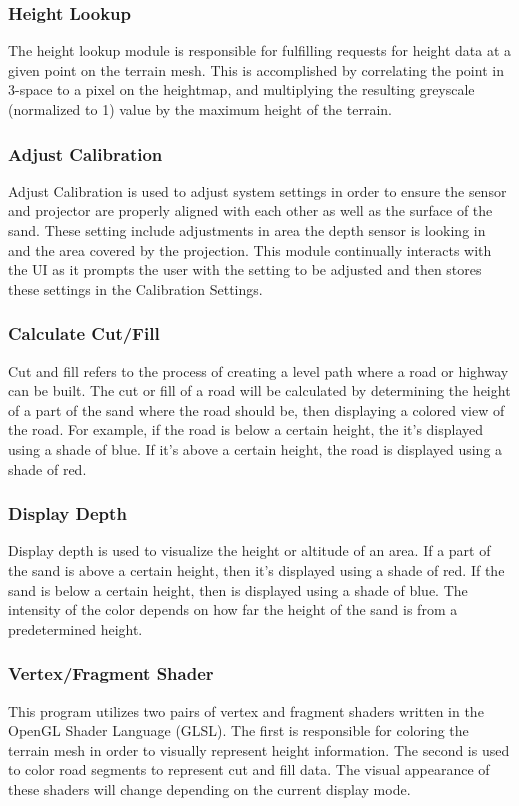 \documentclass[onecolumn, draftclsnofoot,10pt, compsoc]{IEEEtran}
\begin{document}
\subsubsection{Height Lookup}
The height lookup module is responsible for fulfilling requests for height data at a given point on the terrain mesh.
This is accomplished by correlating the point in 3-space to a pixel on the heightmap, and multiplying the resulting greyscale (normalized to 1) value by the maximum height of the terrain.

\subsubsection{Adjust Calibration} %
Adjust Calibration is used to adjust system settings in order to ensure the sensor and projector are properly aligned with each other as well as the surface of the sand.  
These setting include adjustments in area the depth sensor is looking in and the area covered by the projection.
This module continually interacts with the UI as it prompts the user with the setting to be adjusted and then stores these settings in the Calibration Settings.

\subsubsection{Calculate Cut/Fill} %
Cut and fill refers to the process of creating a level path where a road or highway can be built.
The cut or fill of a road will be calculated by determining the height of a part of the sand where the road should be, then displaying a colored view of the road.
For example, if the road is below a certain height, the it's displayed using a shade of blue.
If it's above a certain height, the road is displayed using a shade of red.

\subsubsection{Display Depth} %
Display depth is used to visualize the height or altitude of an area.
If a part of the sand is above a certain height, then it's displayed using a shade of red.
If the sand is below a certain height, then is displayed using a shade of blue.
The intensity of the color depends on how far the height of the sand is from a predetermined height.

\subsubsection{Vertex/Fragment Shader} %
This program utilizes two pairs of vertex and fragment shaders written in the OpenGL Shader Language (GLSL). 
The first is responsible for coloring the terrain mesh in order to visually represent height information. 
The second is used to color road segments to represent cut and fill data. 
The visual appearance of these shaders will change depending on the current display mode.
\end{document}
